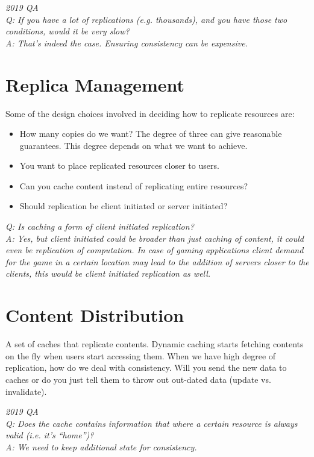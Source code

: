 \documentclass[twoside]{article}
\begin{document}
  \textit{2019 QA\\
  Q: If you have a lot of replications (e.g. thousands), and you have those two conditions, would it be very slow?\\
  A: That's indeed the case. Ensuring consistency can be expensive.\\
  }

\section{Replica Management}
Some of the design choices involved in deciding how to replicate resources are:
\begin{itemize}
 \item How many copies do we want? The degree of three can give reasonable guarantees. This degree depends on what we want to achieve.
 \item You want to place replicated resources closer to users.
 \item Can you cache content instead of replicating entire resources?
 \item Should replication be client initiated or server initiated?
\end{itemize}

\textit{Q: Is caching a form of client initiated replication?\\
  A: Yes, but client initiated could be broader than just caching of content, it could even be replication of computation. In case of gaming applications client demand for the game in a certain location may lead to the addition of servers closer to the clients, this would be client initiated replication as well.}

\section{Content Distribution}
A set of caches that replicate contents. Dynamic caching starts fetching contents on the fly when users start accessing them. When we have high degree of replication, how do we deal with consistency. Will you send the new data to caches or do you just tell them to throw out out-dated data (update vs. invalidate). 

  \textit{2019 QA\\
  Q: Does the cache contains information that where a certain resource is always valid (i.e. it's ``home'')?\\
  A: We need to keep additional state for consistency.\\
  }
\end{document}
